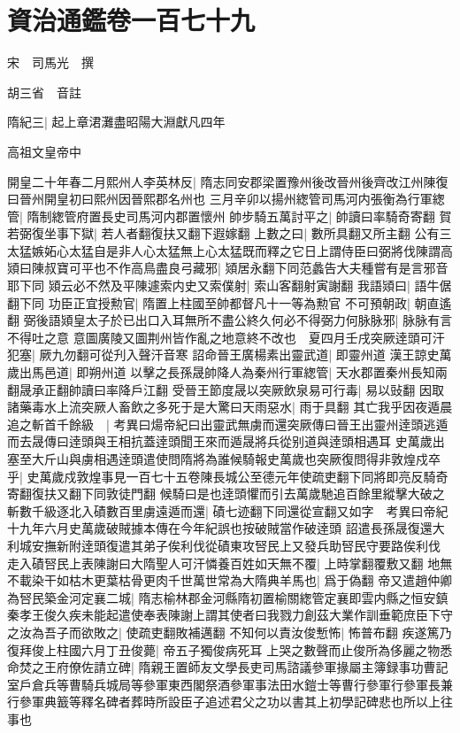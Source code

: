 \chapter{資治通鑑卷一百七十九}
宋　司馬光　撰

胡三省　音註

隋紀三|{
	起上章涒灘盡昭陽大淵獻凡四年}


高祖文皇帝中

開皇二十年春二月熙州人李英林反|{
	隋志同安郡梁置豫州後改晉州後齊改江州陳復曰晉州開皇初曰熙州因晉熙郡名州也}
三月辛卯以揚州緫管司馬河内張衡為行軍緫管|{
	隋制緫管府置長史司馬河内郡置懷州}
帥步騎五萬討平之|{
	帥讀曰率騎奇寄翻}
賀若弼復坐事下獄|{
	若人者翻復扶又翻下遐嫁翻}
上數之曰|{
	數所具翻又所主翻}
公有三太猛嫉妬心太猛自是非人心太猛無上心太猛既而釋之它日上謂侍臣曰弼將伐陳謂高熲曰陳叔寶可平也不作高鳥盡良弓藏邪|{
	熲居永翻下同范蠡告大夫種嘗有是言邪音耶下同}
熲云必不然及平陳遽索内史又索僕射|{
	索山客翻射寅謝翻}
我語熲曰|{
	語牛倨翻下同}
功臣正宜授勲官|{
	隋置上柱國至帥都督凡十一等為勲官}
不可預朝政|{
	朝直遙翻}
弼後語熲皇太子於已出口入耳無所不盡公終久何必不得弼力何脉脉邪|{
	脉脉有言不得吐之意}
意圖廣陵又圖荆州皆作亂之地意終不改也　夏四月壬戌突厥逹頭可汗犯塞|{
	厥九勿翻可從刋入聲汗音寒}
詔命晉王廣楊素出靈武道|{
	即靈州道}
漢王諒史萬歲出馬邑道|{
	即朔州道}
以擊之長孫晟帥降人為秦州行軍緫管|{
	天水郡置秦州長知兩翻晟承正翻帥讀曰率降戶江翻}
受晉王節度晟以突厥飲泉易可行毒|{
	易以䜴翻}
因取諸藥毒水上流突厥人畜飲之多死于是大驚曰天雨惡水|{
	雨于具翻}
其亡我乎因夜遁晨追之斬首千餘級　|{
	考異曰煬帝紀曰出靈武無虜而還突厥傳曰晉王出靈州逹頭逃遁而去晟傳曰逹頭與王相抗蓋逹頭聞王來而遁晟將兵從别道與逹頭相遇耳}
史萬歲出塞至大斤山與虜相遇逹頭遣使問隋將為誰候騎報史萬歲也突厥復問得非敦煌戍卒乎|{
	史萬歲戍敦煌事見一百七十五卷陳長城公至德元年使疏吏翻下同將即亮反騎奇寄翻復扶又翻下同敦徒門翻}
候騎曰是也逹頭懼而引去萬歲馳追百餘里縱擊大破之斬數千級逐北入磧數百里虜遠遁而還|{
	磧七迹翻下同還從宣翻又如字　考異曰帝紀十九年六月史萬歲破賊據本傳在今年紀誤也按破賊當作破逹頭}
詔遣長孫晟復還大利城安撫新附逹頭復遣其弟子俟利伐從磧東攻唘民上又發兵助唘民守要路俟利伐走入磧唘民上表陳謝曰大隋聖人可汗憐養百姓如天無不覆|{
	上時掌翻覆敷又翻}
地無不載染干如枯木更葉枯骨更肉千世萬世常為大隋典羊馬也|{
	爲于偽翻}
帝又遣趙仲卿為唘民築金河定襄二城|{
	隋志榆林郡金河縣隋初置榆關緫管定襄即雲内縣之恒安鎮}
秦孝王俊久疾未能起遣使奉表陳謝上謂其使者曰我戮力創茲大業作訓垂範庶臣下守之汝為吾子而欲敗之|{
	使疏吏翻敗補邁翻}
不知何以責汝俊慙怖|{
	怖普布翻}
疾遂篤乃復拜俊上柱國六月丁丑俊薨|{
	帝五子獨俊病死耳}
上哭之數聲而止俊所為侈麗之物悉命焚之王府僚佐請立碑|{
	隋親王置師友文學長吏司馬諮議參軍掾屬主簿録事功曹記室戶倉兵等曹騎兵城局等參軍東西閣祭酒參軍事法田水鎧士等曹行參軍行參軍長兼行參軍典籖等釋名碑者葬時所設臣子追述君父之功以書其上初學記碑悲也所以上往事也}
